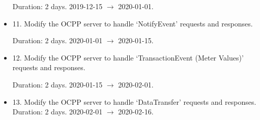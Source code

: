 \documentclass[11pt]{article}
\begin{document}
\begin{itemize}
	Duration: 2 days. 2019-12-15 $\rightarrow$ 2020-01-01.
	
	\item 11. Modify the OCPP server to handle `NotifyEvent' requests and responses.
	
	Duration: 2 days. 2020-01-01 $\rightarrow$ 2020-01-15.
	
	\item 12. Modify the OCPP server to handle `TransactionEvent (Meter Values)' requests and responses.
	
	Duration: 2 days. 2020-01-15 $\rightarrow$ 2020-02-01.
	
	\item 13. Modify the OCPP server to handle `DataTransfer' requests and responses.
	Duration: 2 days. 2020-02-01 $\rightarrow$ 2020-02-16.
	
\end{itemize}
	
\nocite{*}


\end{document}
